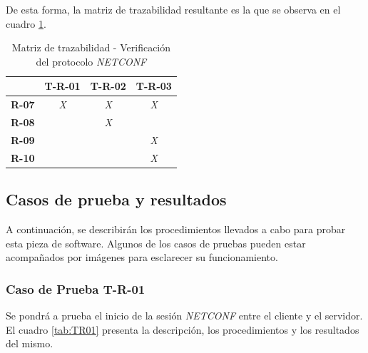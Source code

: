De esta forma, la matriz de trazabilidad resultante es la que se observa en el cuadro \ref{tab:matriz_netconf}.

\begin{table}[!h]
    \centering
    \begin{tabular}{|c|c|c|c|}
    \hline
                  & \textbf{T-R-01} & \textbf{T-R-02} & \textbf{T-R-03} \\ \hline
    \textbf{R-07} & \textit{X}      & \textit{X}      & \textit{X}      \\ \hline
    \textbf{R-08} & \textit{}       & \textit{X}      & \textit{}       \\ \hline
    \textbf{R-09} & \textit{}       & \textit{}       & \textit{X}      \\ \hline
    \textbf{R-10} & \textit{}       & \textit{}       & \textit{X}      \\ \hline
    \end{tabular}
    \caption{Matriz de trazabilidad - Verificación del protocolo \textit{NETCONF}}
    \label{tab:matriz_netconf}
\end{table}


\subsection{Casos de prueba y resultados}

A continuación, se describirán los procedimientos llevados a cabo para probar esta pieza de software. Algunos de los casos de pruebas pueden estar acompañados por imágenes para esclarecer su funcionamiento.

\subsubsection{Caso de Prueba T-R-01}
Se pondrá a prueba el inicio de la sesión \textit{NETCONF} entre el cliente y el servidor. El cuadro \ref{tab:TR01} presenta la descripción, los procedimientos y los resultados del mismo. 

